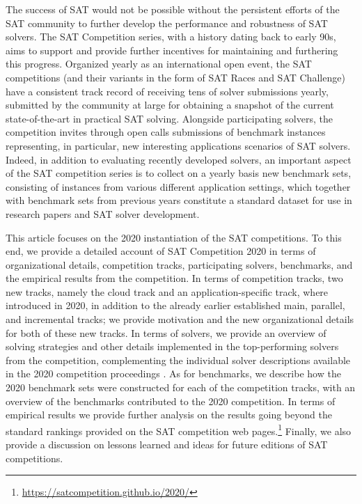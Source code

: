 \documentclass{elsarticle}
\begin{document}
The success of SAT would not be possible without the persistent efforts of the SAT community to further develop the performance and robustness
of SAT solvers. The SAT Competition series, with a history dating back to early 90s, aims to support and provide further incentives 
for maintaining and furthering this progress. Organized yearly as an international open event, the SAT competitions (and their variants
in the form of SAT Races and SAT Challenge) have a consistent track record of receiving tens of solver submissions yearly, submitted
by the community at large for obtaining a snapshot of the current state-of-the-art in practical SAT solving. Alongside participating solvers,
the competition invites through open calls submissions of benchmark instances representing, in particular, new interesting applications 
scenarios of SAT solvers. Indeed, in addition to evaluating recently developed solvers, an important aspect of the SAT competition series is
to collect on a yearly basis new benchmark sets, consisting of instances from various different application settings, which together with benchmark sets from previous years constitute a standard dataset for use in research papers and SAT solver development. 

This article focuses on the 2020 instantiation of the SAT competitions. 
To this end, we provide
a detailed account of SAT Competition 2020 in terms of organizational details, competition tracks,
participating solvers, benchmarks, and the empirical results from the competition.
In terms of competition tracks, two new tracks, namely the cloud track and an application-specific track, where introduced in 2020,
in addition to the already earlier established main, parallel, and incremental tracks; we
provide motivation and the new organizational details for both of these new tracks.
In terms of solvers, we provide an overview of solving strategies and other details implemented in the top-performing solvers
from the competition, complementing the individual solver descriptions available in the 2020 competition proceedings \cite{SC2020}.
 As for benchmarks, we describe how the 2020 benchmark sets were constructed for each of the competition tracks, with 
an overview of the benchmarks contributed to the 2020 competition.
In terms of empirical results we provide further analysis on the results going beyond the standard rankings provided
on the SAT competition web pages.\footnote{\url{https://satcompetition.github.io/2020/}}
Finally, we also provide a discussion on lessons learned and ideas for future editions of SAT competitions.
\end{document}
